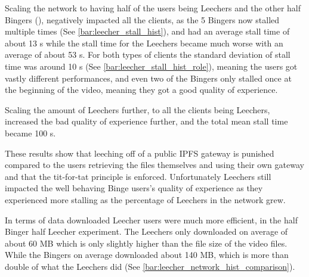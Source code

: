 \if{}



\fi

Scaling the network to having half of the users being Leechers and the other half Bingers (), negatively impacted all the clients, as the 5 Bingers now stalled multiple times (See \autoref{bar:leecher_stall_hist}), and had an average stall time of about 13 \ac{s} while the stall time for the Leechers became much worse with an average of about 53 \ac{s}. For both types of clients the standard deviation of stall time was around 10 \ac{s} (See \autoref{bar:leecher_stall_hist_role}), meaning the users got vastly different performances, and even two of the Bingers only stalled once at the beginning of the video, meaning they got a good quality of experience.

\if{}


\fi
%

Scaling the amount of Leechers further, to all the clients being Leechers, increased the bad quality of experience further, and the total mean stall time became 100 \ac{s}.

These results show that leeching off of a public \ac{IPFS} gateway is punished compared to the users retrieving the files themselves and using their own gateway and that the tit-for-tat principle is enforced. Unfortunately Leechers still impacted the well behaving Binge users's quality of experience as they experienced more stalling as the percentage of Leechers in the network grew.

In terms of data downloaded Leecher users were much more efficient, in the half Binger half Leecher experiment. The Leechers only downloaded on average of about 60 \ac{MB} which is only slightly higher than the file size of the video files. While the Bingers on average downloaded about 140 \ac{MB}, which is more than double of what the Leechers did (See \autoref{bar:leecher_network_hist_comparison}). 

